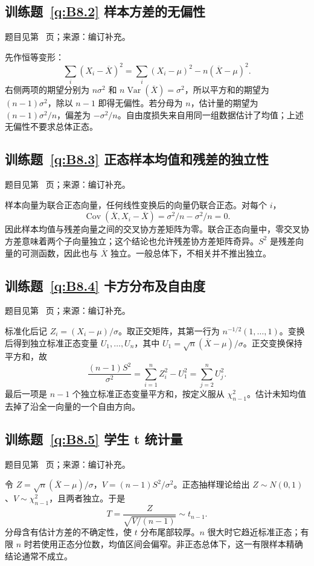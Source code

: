 \subsection*{训练题~\ref{q:B8.2} 样本方差的无偏性}\label{a:B8.2}{\small 题目见第~\pageref{q:B8.2} 页；来源：编订补充。}
\begin{solve}先作恒等变形：\[\sum_i(X_i-\overline X)^2=\sum_i(X_i-\mu)^2-n(\overline X-\mu)^2.\]右侧两项的期望分别为 $n\sigma^2$ 和 $n\operatorname{Var}(\overline X)=\sigma^2$，所以平方和的期望为 $(n-1)\sigma^2$，除以 $n-1$ 即得无偏性。若分母为 $n$，估计量的期望为 $(n-1)\sigma^2/n$，偏差为 $-\sigma^2/n$。自由度损失来自用同一组数据估计了均值；上述无偏性不要求总体正态。\end{solve}

\subsection*{训练题~\ref{q:B8.3} 正态样本均值和残差的独立性}\label{a:B8.3}{\small 题目见第~\pageref{q:B8.3} 页；来源：编订补充。}
\begin{solve}样本向量为联合正态向量，任何线性变换后的向量仍联合正态。对每个 $i$，\[\operatorname{Cov}(\overline X,X_i-\overline X)=\sigma^2/n-\sigma^2/n=0.\]因此样本均值与残差向量之间的交叉协方差矩阵为零。联合正态向量中，零交叉协方差意味着两个子向量独立；这个结论也允许残差协方差矩阵奇异。$S^2$ 是残差向量的可测函数，因此也与 $\overline X$ 独立。一般总体下，不相关并不推出独立。\end{solve}

\subsection*{训练题~\ref{q:B8.4} 卡方分布及自由度}\label{a:B8.4}{\small 题目见第~\pageref{q:B8.4} 页；来源：编订补充。}
\begin{solve}标准化后记 $Z_i=(X_i-\mu)/\sigma$。取正交矩阵，其第一行为 $n^{-1/2}(1,\ldots,1)$。变换后得到独立标准正态变量 $U_1,\ldots,U_n$，其中 $U_1=\sqrt n(\overline X-\mu)/\sigma$。正交变换保持平方和，故\[\frac{(n-1)S^2}{\sigma^2}=\sum_{i=1}^nZ_i^2-U_1^2=\sum_{j=2}^nU_j^2.\]最后一项是 $n-1$ 个独立标准正态变量平方和，按定义服从 $\chi^2_{n-1}$。估计未知均值去掉了沿全一向量的一个自由方向。\end{solve}

\subsection*{训练题~\ref{q:B8.5} 学生 t 统计量}\label{a:B8.5}{\small 题目见第~\pageref{q:B8.5} 页；来源：编订补充。}
\begin{solve}令 $Z=\sqrt n(\overline X-\mu)/\sigma$，$V=(n-1)S^2/\sigma^2$。正态抽样理论给出 $Z\sim N(0,1)$、$V\sim\chi^2_{n-1}$，且两者独立。于是\[T=\frac{Z}{\sqrt{V/(n-1)}}\sim t_{n-1}.\]分母含有估计方差的不确定性，使 $t$ 分布尾部较厚。$n$ 很大时它趋近标准正态；有限 $n$ 时若使用正态分位数，均值区间会偏窄。非正态总体下，这一有限样本精确结论通常不成立。\end{solve}

